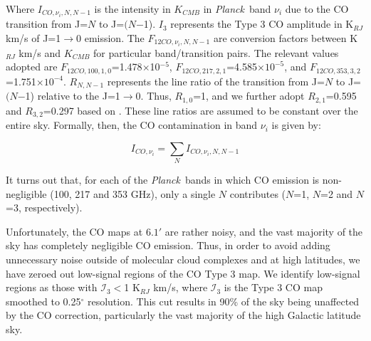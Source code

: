 \documentclass{emulateapj}
\newcommand{\PLANCK}{{\it Planck}}
\begin{document}
Where $I_{CO, \nu_i, N, N-1}$ is the intensity in $K_{CMB}$ in \PLANCK~band 
$\nu_i$ due to the CO transition from J=$N$ to J=$(N$$-$1). $I_3$ represents 
the Type 3 CO amplitude in  K$_{RJ}$ km/s of J=1$\rightarrow$0 emission. The 
$F_{12CO, \nu_i, N, N-1}$ are conversion factors between K$_{RJ}$ km/s and 
$K_{CMB}$ for particular band/transition pairs. The relevant values adopted are
$F_{12CO, 100, 1, 0}$=1.478$\times$10$^{-5}$, 
$F_{12CO, 217, 2, 1}$=4.585$\times$$10^{-5}$, and 
$F_{12CO, 353, 3, 2}$=1.751$\times$$10^{-4}$.
$R_{N, N-1}$ represents the line ratio of the transition from J=$N$ to 
J=$(N$$-$1) relative to the J=1$\rightarrow$0. Thus, $R_{1,0}$=1, and we 
further adopt $R_{2,1}$=0.595 and $R_{3,2}$=0.297 based on \cite{planckco}. 
These line ratios are assumed to be constant over the entire sky. Formally, 
then, the CO contamination in band $\nu_i$ is given by:

\begin{equation}
I_{CO, \nu_i} = \sum\limits_{N} I_{CO, \nu_i, N, N-1}
\end{equation}

It turns out that, for each of the \PLANCK~bands in which CO emission is
non-negligible (100, 217 and 353 GHz), only a single $N$ contributes ($N$=1, 
$N$=2 and $N$=3, respectively). 

Unfortunately, the CO maps at $6.1'$ are rather noisy,
and the vast majority of the sky has completely negligible CO emission. Thus,
in order to avoid adding unnecessary noise outside of molecular cloud complexes
and at high latitudes, we have zeroed out low-signal regions of the CO Type 3
map. We identify  low-signal regions as those with $\mathcal{I}_3$$<$1 K$_{RJ}$
 km/s, where $\mathcal{I}_3$ is the Type 3 CO map smoothed to 0.25$^{\circ}$ 
resolution. This cut results in 90\% of the sky being unaffected by the CO 
correction, particularly the vast majority of the high Galactic latitude sky.




\end{document}
